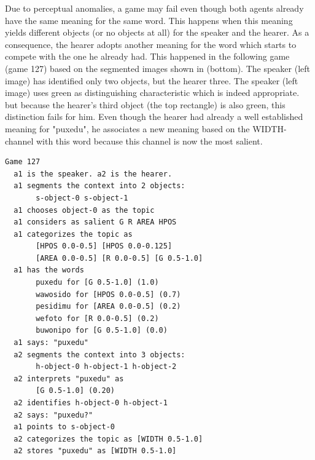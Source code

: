 Due to perceptual anomalies, a game may fail even though 
both agents already have the same meaning for the 
same word. This happens when this meaning yields different 
objects (or no objects at all) for the speaker and the hearer. 
As a consequence, the hearer adopts another meaning for 
the word which starts to compete with the one he already had. 
This happened in the following game (game 127)
based on the segmented images shown in  (bottom). The speaker (left image) has identified
only two objects, but the hearer three. The 
speaker (left image) uses green as distinguishing 
characteristic which is indeed appropriate. but 
because the hearer's third object (the top rectangle) is 
also green, this distinction fails for him.  
Even though the hearer had already a well established
meaning for "puxedu", he associates a new meaning 
based on the WIDTH-channel with this word because this 
channel is now the most salient. 
\begin{verbatim}
Game 127
  a1 is the speaker. a2 is the hearer. 
  a1 segments the context into 2 objects: 
       s-object-0 s-object-1
  a1 chooses object-0 as the topic 
  a1 considers as salient G R AREA HPOS 
  a1 categorizes the topic as 
       [HPOS 0.0-0.5] [HPOS 0.0-0.125]
       [AREA 0.0-0.5] [R 0.0-0.5] [G 0.5-1.0]
  a1 has the words
       puxedu for [G 0.5-1.0] (1.0)
       wawosido for [HPOS 0.0-0.5] (0.7)
       pesidimu for [AREA 0.0-0.5] (0.2)
       wefoto for [R 0.0-0.5] (0.2)
       buwonipo for [G 0.5-1.0] (0.0)
  a1 says: "puxedu"
  a2 segments the context into 3 objects: 
       h-object-0 h-object-1 h-object-2
  a2 interprets "puxedu" as
       [G 0.5-1.0] (0.20)
  a2 identifies h-object-0 h-object-1
  a2 says: "puxedu?"
  a1 points to s-object-0
  a2 categorizes the topic as [WIDTH 0.5-1.0]
  a2 stores "puxedu" as [WIDTH 0.5-1.0]
\end{verbatim}

